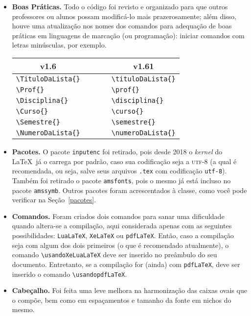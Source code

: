 \begin{itemize}
 \item \textbf{Boas Práticas.} Todo o código foi revisto e organizado para que 
  outros professores ou alunos possam modificá-lo mais prazerosamente; além 
  disso, houve uma atualização nos nomes dos comandos para adequação de boas 
  práticas em linguagens de marcação (ou programação): iniciar comandos com 
  letras minúsculas, por exemplo.
  
  \begin{table}[!h]
   \centering
   \begin{tabular}{lcccl}
    \toprule
     \multicolumn{1}{c}{\textbf{v1.6}} &&&& \multicolumn{1}{c}{\textbf{v1.61}}\\
    \midrule
     \verb|\TituloDaLista{}|           &&&& \verb|\tituloDaLista{}| \\
     \verb|\Prof{}|                    &&&& \verb|\prof{}| \\
     \verb|\Disciplina{}|              &&&& \verb|\disciplina{}| \\
     \verb|\Curso{}|                   &&&& \verb|\curso{}| \\
     \verb|\Semestre{}|                &&&& \verb|\semestre{}|\\
     \verb|\NumeroDaLista{}|           &&&& \verb|\numeroDaLista{}| \\
    \bottomrule
   \end{tabular}
  \end{table}
  
 \item \textbf{Pacotes.} O pacote \texttt{inputenc} foi retirado, pois desde 
  2018 o \textit{kernel} do \LaTeX\ já o carrega por padrão, caso sua
  codificação seja a \textsc{utf-8} (a qual é recomendada, ou seja, salve seus
  arquivos \texttt{.tex} com codificação \texttt{utf-8}).
  Também foi retirado o pacote \texttt{amsfonts}, pois o mesmo já está incluso
  no pacote \texttt{amssymb}.
  Outros pacotes foram acrescentados à classe, como você pode verificar na 
  Seção~\ref{pacotes}.
  
 \item \textbf{Comandos.} Foram criados dois comandos para sanar uma dificuldade
  quando altera-se a compilação, aqui considerada apenas com as seguintes 
  possibilidades: \texttt{LuaLaTeX}, \texttt{XeLaTeX} ou \texttt{pdfLaTeX}.
  Então, caso a compilação seja com algum dos dois primeiros (o que é recomendado 
  atualmente), o comando \verb|\usandoXeLuaLaTeX| deve ser inserido no preâmbulo
  do seu documento.
  Entretanto, se a compilação for (ainda) com \texttt{pdfLaTeX}, deve ser inserido
  o comando \verb|\usandopdfLaTeX|.
  
 \item \textbf{Cabeçalho.} Foi feita uma leve melhora na harmonização das caixas
  ovais que o compõe, bem como em espaçamentos e tamanho da fonte em nichos do
  mesmo.
\end{itemize}
%
